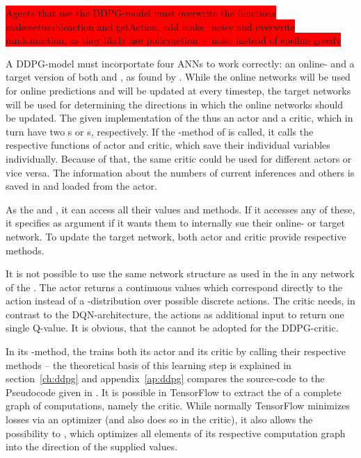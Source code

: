 \colorbox{red}{Agents that use the DDPG-model must overwrite the functions makenetusableaction and getAction, add make\_noisy and overwrite randomaction, as they likely use policyaction + noise instead of epsilon-greedy}

A DDPG-model must incorportate four ANNs to work correctly: an online- and a target version of both  and , as found by \cite{lillicrap_continuous_2015}.  While the online networks will be used for online predictions and will be updated at every timestep, the target networks will be used for determining the directions in which the online networks should be updated. The given implementation of the  thus  an actor and a critic, which in turn have two s or s, respectively. If the -method of  is called, it calls the respective functions of actor and critic, which save their individual variables individually. Because of that, the same critic could be used for different actors or vice versa. The information about the numbers of current inferences and others is saved in and loaded from the actor.

As the    and , it can access all their values and methods. If it accesses any of these, it specifies as argument if it wants them to internally sue their online- or target network. To update the target network, both actor and critic provide respective methods.

It is not possible to use the same network structure as used in the  in any network of the . The actor returns a continuous values which correspond directly to the action instead of a -distribution over possible discrete actions. The critic needs, in contrast to the DQN-architecture, the actions as additional input to return one single Q-value. It is obvious, that the  cannot be adopted for the DDPG-critic.

In its -method, the  trains both its actor and its critic by calling their respective methods -- the theoretical basis of this learning step is explained in section~\ref{ch:ddpg} and appendix~\ref{ap:ddpg} compares the source-code to the Pseudocode given in \cite{lillicrap_continuous_2015}. It is possible in TensorFlow to extract the  of a complete graph of computations, namely the critic. While normally TensorFlow minimizes losses via an optimizer (and also does so in the critic), it also allows the possibility to , which optimizes all elements of its respective computation graph into the direction of the supplied values. 

